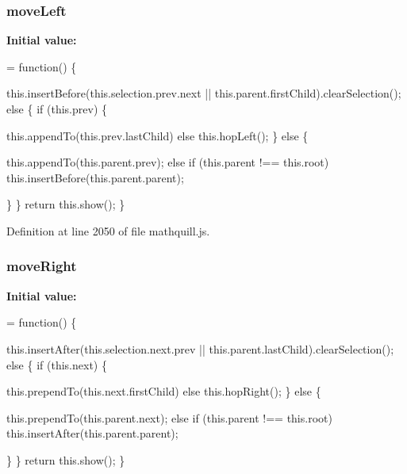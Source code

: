 \subsubsection[{move\-Left}]{\setlength{\rightskip}{0pt plus 5cm}{\bf \-\_\-} move\-Left}\label{mathquill_8js_a6e6c2a6d950dc61ed0511cf7b30b0ce4}
{\bfseries Initial value\-:}
\begin{DoxyCode}
= \textcolor{keyword}{function}() \{

    this.insertBefore(this.selection.prev.next || \textcolor{keyword}{this}.parent.firstChild).clearSelection();
  \textcolor{keywordflow}{else} \{
    \textcolor{keywordflow}{if} (this.prev) \{

        this.appendTo(this.prev.lastChild)
      else
        this.hopLeft();
    \}
    else \{ 

        this.appendTo(this.parent.prev);
      \textcolor{keywordflow}{else} \textcolor{keywordflow}{if} (this.parent !== this.root)
        this.insertBefore(this.parent.parent);
      
    \}
  \}
  \textcolor{keywordflow}{return} this.show();
\}
\end{DoxyCode}


Definition at line 2050 of file mathquill.\-js.

\subsubsection[{move\-Right}]{\setlength{\rightskip}{0pt plus 5cm}{\bf \-\_\-} move\-Right}\label{mathquill_8js_a8e3b2591d7b4c4bbaab5281cf417f033}
{\bfseries Initial value\-:}
\begin{DoxyCode}
= \textcolor{keyword}{function}() \{

    this.insertAfter(this.selection.next.prev || \textcolor{keyword}{this}.parent.lastChild).clearSelection();
  \textcolor{keywordflow}{else} \{
    \textcolor{keywordflow}{if} (this.next) \{

        this.prependTo(this.next.firstChild)
      else
        this.hopRight();
    \}
    else \{ 

        this.prependTo(this.parent.next);
      \textcolor{keywordflow}{else} \textcolor{keywordflow}{if} (this.parent !== this.root)
        this.insertAfter(this.parent.parent);
      
    \}
  \}
  \textcolor{keywordflow}{return} this.show();
\}
\end{DoxyCode}



